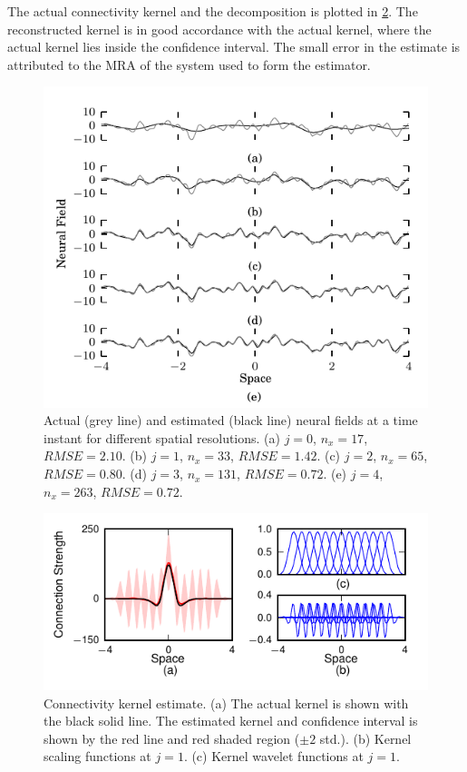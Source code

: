\documentclass[journal]{IEEEtran}
\begin{document}
The actual connectivity kernel and the decomposition is plotted in \figurename{\ref{fig:KernelEstimate}}. The reconstructed kernel is in good accordance with the actual kernel, where the actual kernel lies inside the confidence interval. The small error in the estimate is attributed to the MRA of the system used to form the estimator.
\begin{figure}[!h] 
	\centering
		\includegraphics[scale=1]{./Graph/Field.pdf}
		\caption{Actual (grey line) and estimated (black line) neural fields at a time instant for different spatial resolutions. (a) $j=0$, $n_x=17$, $RMSE = 2.10$. (b) $j=1$, $n_x=33$, $RMSE = 1.42$. (c) $j=2$, $n_x=65$, $RMSE = 0.80$. (d) $j=3$, $n_x=131$, $RMSE = 0.72$. (e) $j=4$, $n_x=263$, $RMSE=0.72$.}
	\label{fig:FieldEstimates}
\end{figure} 
\begin{figure}[!h] 
	\centering
		\includegraphics[scale=1]{./Graph/KernelUnknownSupportWithVarsigma.pdf}
		\caption{Connectivity kernel estimate. (a) The actual kernel is shown with the black solid line. The estimated kernel and confidence interval is shown by the red line and red shaded region ($\pm2$ std.). (b) Kernel scaling functions at $j=1$. (c) Kernel wavelet functions at $j=1$.}
	\label{fig:KernelEstimate}
\end{figure}
\end{document}
